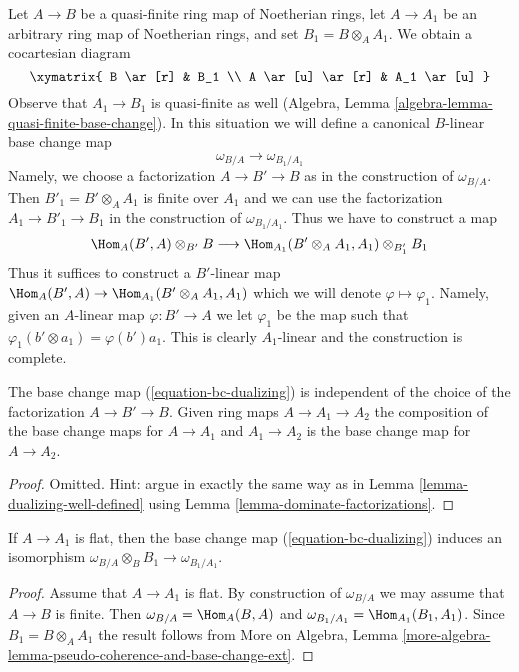\noindent
Let $A \to B$ be a quasi-finite ring map of Noetherian rings, let
$A \to A_1$ be an arbitrary ring map of Noetherian rings, and set
$B_1 = B \otimes_A A_1$. We obtain a cocartesian diagram
$$
\xymatrix{
B \ar[r] & B_1 \\
A \ar[u] \ar[r] & A_1 \ar[u]
}
$$
Observe that $A_1 \to B_1$ is quasi-finite as well (Algebra, Lemma
\ref{algebra-lemma-quasi-finite-base-change}).
In this situation we will define a canonical
$B$-linear base change map
\begin{equation}
\label{equation-bc-dualizing}
\omega_{B/A} \longrightarrow \omega_{B_1/A_1}
\end{equation}
Namely, we choose a factorization $A \to B' \to B$ as in the construction
of $\omega_{B/A}$. Then $B'_1 = B' \otimes_A A_1$ is finite over $A_1$
and we can use the factorization $A_1 \to B'_1 \to B_1$ in the construction
of $\omega_{B_1/A_1}$. Thus we have to construct a map
$$
\Hom_A(B', A) \otimes_{B'} B
\longrightarrow
\Hom_{A_1}(B' \otimes_A A_1, A_1) \otimes_{B'_1} B_1
$$
Thus it suffices to construct a $B'$-linear map
$\Hom_A(B', A) \to \Hom_{A_1}(B' \otimes_A A_1, A_1)$
which we will denote $\varphi \mapsto \varphi_1$.
Namely, given an $A$-linear map $\varphi : B' \to A$ we
let $\varphi_1$ be the map such that
$\varphi_1(b' \otimes a_1) = \varphi(b')a_1$.
This is clearly $A_1$-linear and the construction is complete.

\begin{lemma}
\label{lemma-bc-map-dualizing}
The base change map (\ref{equation-bc-dualizing})
is independent of the choice of the
factorization $A \to B' \to B$. Given ring maps $A \to A_1 \to A_2$
the composition of the base change maps for $A \to A_1$ and $A_1 \to A_2$
is the base change map for $A \to A_2$.
\end{lemma}

\begin{proof}
Omitted. Hint: argue in exactly the same way as in
Lemma \ref{lemma-dualizing-well-defined}
using Lemma \ref{lemma-dominate-factorizations}.
\end{proof}

\begin{lemma}
\label{lemma-dualizing-flat-base-change}
If $A \to A_1$ is flat, then
the base change map (\ref{equation-bc-dualizing}) induces an isomorphism
$\omega_{B/A} \otimes_B B_1 \to \omega_{B_1/A_1}$.
\end{lemma}

\begin{proof}
Assume that $A \to A_1$ is flat. By construction of $\omega_{B/A}$ we may
assume that $A \to B$ is finite. Then $\omega_{B/A} = \Hom_A(B, A)$ and
$\omega_{B_1/A_1} = \Hom_{A_1}(B_1, A_1)$. Since $B_1 = B \otimes_A A_1$
the result follows from More on Algebra, Lemma
\ref{more-algebra-lemma-pseudo-coherence-and-base-change-ext}.
\end{proof}

